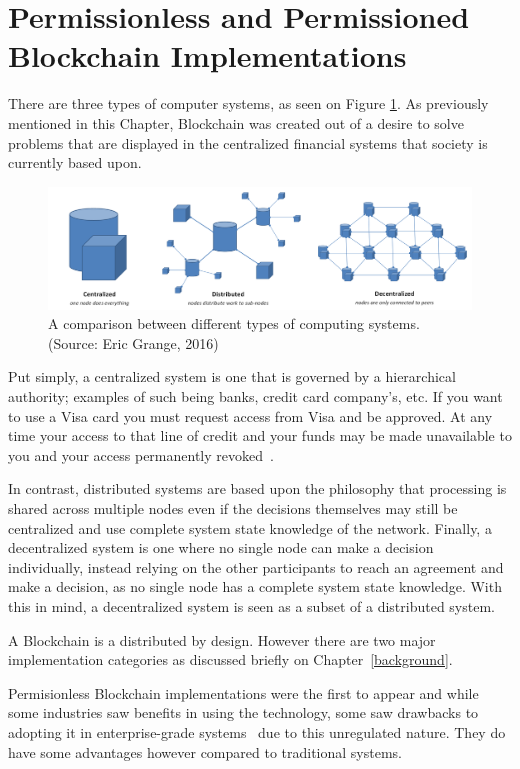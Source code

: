 \section{Permissionless and Permissioned Blockchain Implementations}


There are three types of computer systems, as seen on Figure
\ref{fig:typesofnetworks}. As previously mentioned in this Chapter, Blockchain
was created out of a desire to solve problems that are displayed in the
centralized financial systems that society is currently based upon.

\begin{figure}[h]
	\centering
	\includegraphics[width=1\linewidth]{imgs/typesofnetworks.png}
  \caption{\label{fig:typesofnetworks} A comparison between different types of
  computing systems. (Source: Eric Grange, 2016)}
\end{figure}

Put simply, a centralized system is one that is governed by a hierarchical
authority; examples of such being banks, credit card company’s, etc. If you
want to use a Visa card you must request access from Visa and be approved. At
any time your access to that line of credit and your funds may be made
unavailable to you and your access permanently revoked~\cite{Dreifuerst2018}.

In contrast, distributed systems are based upon the philosophy that processing
is shared across multiple nodes even if the decisions themselves may still be
centralized and use complete system state knowledge of the network. Finally, a
decentralized system is one where no single node can make a decision
individually, instead relying on the other participants to reach an agreement
and make a decision, as no single node has a complete system state knowledge.
With this in mind, a decentralized system is seen as a subset of a distributed
system.

A Blockchain is a distributed by design. However there are two major
implementation categories as discussed briefly on Chapter~\ref{background}.

Permisionless Blockchain implementations were the first to appear and while
some industries saw benefits in using the technology, some saw drawbacks to
adopting it in enterprise-grade systems~\cite{Gopinath2016} due to this
unregulated nature. They do have some advantages however compared to
traditional systems.

